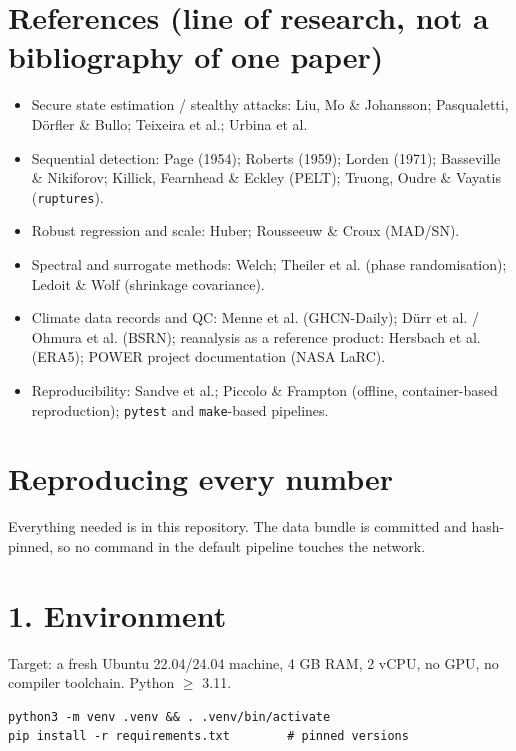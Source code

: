 \documentclass[10pt,a4paper]{article}
\begin{document}
\section*{References (line of research, not a bibliography of one paper)}
\begin{itemize}
\item Secure state estimation /\allowbreak{} stealthy attacks: Liu, Mo \& Johansson; Pasqualetti,
Dörfler \& Bullo; Teixeira et al.; Urbina et al.

\item Sequential detection: Page (1954); Roberts (1959); Lorden (1971); Basseville \&
Nikiforov; Killick, Fearnhead \& Eckley (PELT); Truong, Oudre \& Vayatis (\texttt{ruptures}).

\item Robust regression and scale: Huber; Rousseeuw \& Croux (MAD/\allowbreak{}SN).
\item Spectral and surrogate methods: Welch; Theiler et al. (phase randomisation);
Ledoit \& Wolf (shrinkage covariance).

\item Climate data records and QC: Menne et al. (GHCN-\allowbreak{}Daily); Dürr et al. /\allowbreak{} Ohmura
et al. (BSRN); reanalysis as a reference product: Hersbach et al. (ERA5); POWER project documentation (NASA LaRC).

\item Reproducibility: Sandve et al.; Piccolo \& Frampton (offline, container-\allowbreak{}based
reproduction); \texttt{pytest} and \texttt{make}-\allowbreak{}based pipelines.

\end{itemize}

\clearpage
\section*{Reproducing every number}
Everything needed is in this repository. The data bundle is committed and hash-\allowbreak{}pinned, so no command in the default pipeline touches the network.

\section*{1. Environment}
Target: a fresh Ubuntu 22.04/\allowbreak{}24.04 machine, 4 GB RAM, 2 vCPU, no GPU, no compiler toolchain. Python $\geq$ 3.11.

\begin{Verbatim}[breaklines=true,breakanywhere=true,fontsize=\footnotesize,frame=none,numbers=none]
python3 -m venv .venv && . .venv/bin/activate
pip install -r requirements.txt        # pinned versions
\end{Verbatim}
\end{document}
